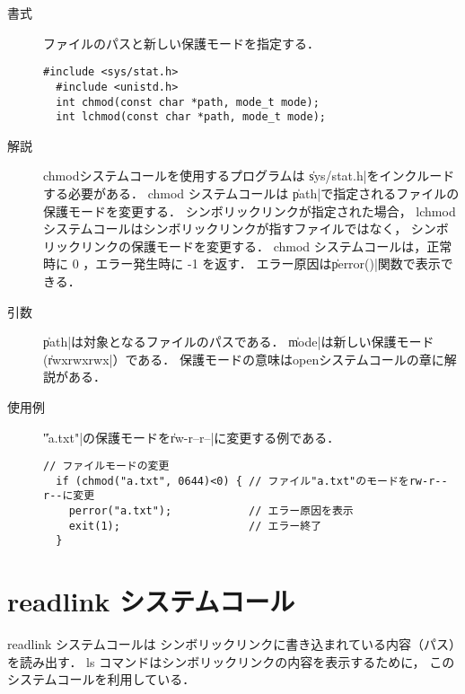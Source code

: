 \begin{description}
\item[書式] ファイルのパスと新しい保護モードを指定する．
\begin{lstlisting}[numbers=none]
  #include <sys/stat.h>
  #include <unistd.h>
  int chmod(const char *path, mode_t mode);
  int lchmod(const char *path, mode_t mode);
\end{lstlisting}

\item[解説] chmodシステムコールを使用するプログラムは
\|sys/stat.h|をインクルードする必要がある．
chmod システムコールは
\|path|で指定されるファイルの保護モードを変更する．
シンボリックリンクが指定された場合，
lchmod システムコールはシンボリックリンクが指すファイルではなく，
シンボリックリンクの保護モードを変更する．
chmod システムコールは，正常時に 0 ，エラー発生時に -1 を返す．
エラー原因は\|perror()|関数で表示できる．

\item[引数] \|path|は対象となるファイルのパスである．
\|mode|は新しい保護モード(\|rwxrwxrwx|）である．
保護モードの意味はopenシステムコールの章に解説がある．

\item[使用例] \|"a.txt"|の保護モードを\|rw-r--r--|に変更する例である．
\begin{lstlisting}[numbers=none]
  // ファイルモードの変更
  if (chmod("a.txt", 0644)<0) { // ファイル"a.txt"のモードをrw-r--r--に変更
    perror("a.txt");            // エラー原因を表示
    exit(1);                    // エラー終了
  }
\end{lstlisting}
\end{description}

\section{readlink システムコール}

readlink システムコールは
シンボリックリンクに書き込まれている内容（パス）を読み出す．
ls コマンドはシンボリックリンクの内容を表示するために，
このシステムコールを利用している．

